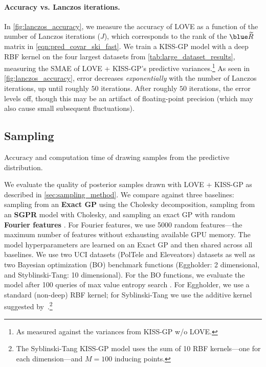 \paragraph{Accuracy vs. Lanczos iterations.}
In \cref{fig:lanczos_accuracy}, we measure the accuracy of LOVE{} as a function of the number of Lanczos iterations ($J$), which corresponds to the rank of the $\blue \widetilde \bR$ matrix in \cref{eqn:pred_covar_ski_fast}.
We train a KISS-GP model with a deep RBF kernel on the four largest datasets from \cref{tab:large_dataset_results}, measuring the SMAE of LOVE + KISS-GP's predictive variances.\footnote{
  As measured against the variances from KISS-GP w/o LOVE.
}
As seen in \cref{fig:lanczos_accuracy}, error decreases \emph{exponentially} with the number of Lanczos iterations, up until roughly $50$ iterations.
After roughly $50$ iterations, the error levels off, though this may be an artifact of floating-point precision (which may also cause small subsequent fluctuations).



\subsection{Sampling}

\begin{table}[t!]
  \caption[Accuracy and computation time of drawing samples from the posterior distribution.]{
    Accuracy and computation time of drawing samples from the predictive distribution.
    \label{tab:sampling_results}
  }
  \vspace{0.5ex}
  \centering
  \resizebox{\textwidth}{!}{%
    
  }
  \vspace{1em}

  \resizebox{\textwidth}{!}{%
    
  }
\end{table}

We evaluate the quality of posterior samples drawn with LOVE + KISS-GP{} as described in \cref{sec:sampling_method}.
We compare against three baselines: sampling from an {\bf Exact GP} using the Cholesky decomposition, sampling from an {\bf SGPR} model with Cholesky, and sampling an exact GP with random {\bf Fourier features} \citep{rahimi2008random}.
For Fourier features, we use 5000 random features---the maximum number of features without exhausting available GPU memory.
The model hyperparameters are learned on an Exact GP and then shared across all baselines.
We use two UCI datasets (PolTele and Eleveators) datasets as well as two Bayesian optimization (BO) benchmark functions (Eggholder: 2 dimensional, and Styblinski-Tang: 10 dimensional).
For the BO functions, we evaluate the model after 100 queries of max value entropy search \cite{wang2017max}.
For Eggholder, we use a standard (non-deep) RBF kernel;  for Syblinski-Tang we use the additive kernel suggested by~\citet{kandasamy2015high}.\footnote{
  The Syblinski-Tang KISS-GP model uses the sum of 10 RBF kernels---one for each dimension---and $M=100$ inducing points.
}

